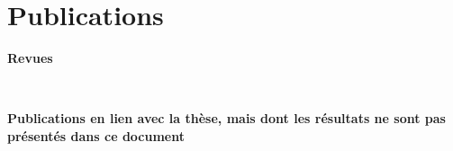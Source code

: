 \chapter*{Publications}



{\setlength{\parindent}{0cm}\textbf{Revues}} \\ \medskip

\begin{refsection}

    \small
    \nocite{*} %
    \printbibliography[heading=none]
    
\end{refsection}


\vfill
{}\\ \medskip

\begin{refsection}

    \small
    \nocite{*} %
    \printbibliography[heading=none]
    
\end{refsection}
\vfill

\newpage
\vfill
{\setlength{\parindent}{0cm}\textbf{Publications en lien avec la thèse, mais dont les résultats ne sont pas présentés dans ce document}}\\ \medskip

\begin{refsection}

    \small
    \nocite{*} %
    \printbibliography[heading=none]
    
\end{refsection}